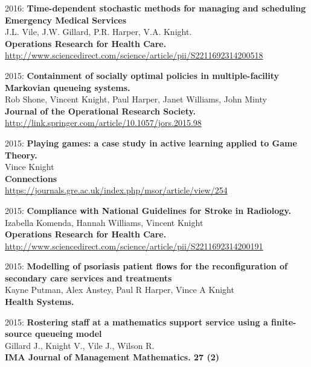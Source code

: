 \documentclass[10pt]{res} %
\begin{document}
\begin{resume}
\begin{etaremune}
\item
2016: \textbf{Time-dependent stochastic methods for managing and scheduling Emergency Medical Services}\\
J.L. Vile, J.W. Gillard, P.R. Harper, V.A. Knight.\\
\textbf{Operations Research for Health Care.}
\\
\url{http://www.sciencedirect.com/science/article/pii/S2211692314200518}
\\

\item
2015: \textbf{Containment of socially optimal policies in multiple-facility Markovian queueing systems.}\\
Rob Shone, Vincent Knight, Paul Harper, Janet Williams, John Minty\\
\textbf{Journal of the Operational Research Society.}
\\
\url{http://link.springer.com/article/10.1057/jors.2015.98}
\\

\item
2015: \textbf{Playing games: a case study in active learning applied to Game Theory.}\\
Vince Knight\\
\textbf{Connections}
\\
\url{https://journals.gre.ac.uk/index.php/msor/article/view/254}
\\

\item
2015: \textbf{Compliance with National Guidelines for Stroke in Radiology.}\\
Izabella Komenda, Hannah Williams, Vincent Knight\\
\textbf{Operations Research for Health Care.}
\\
\url{http://www.sciencedirect.com/science/article/pii/S2211692314200191}
\\

\item
2015: \textbf{Modelling of psoriasis patient flows for the reconfiguration of secondary care services and treatments}\\
Kayne Putman, Alex Anstey, Paul R Harper, Vince A Knight\\
\textbf{Health Systems.}
\\

\item
2015: \textbf{Rostering staff at a mathematics support service using a finite-source queueing model}\\
Gillard J., Knight V., Vile J., Wilson R.\\
\textbf{IMA Journal of Management Mathematics. 27 (2)}
\\


\end{etaremune}
\end{resume}
\end{document}
